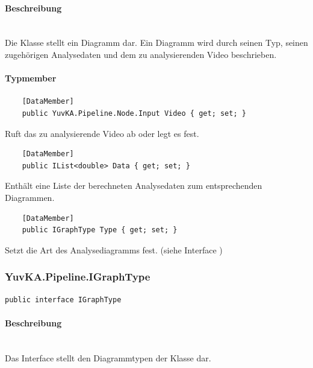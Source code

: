 \paragraph{Beschreibung}~\\
Die Klasse  stellt ein Diagramm dar. Ein Diagramm wird durch seinen Typ, seinen zugehörigen Analysedaten und dem zu analysierenden Video beschrieben.

\paragraph{Typmember}
\begin{itemize}

	\begin{verbatim}
	[DataMember]
	public YuvKA.Pipeline.Node.Input Video { get; set; }
	\end{verbatim}
	Ruft das zu analysierende Video ab oder legt es fest.
	
	\begin{verbatim}
	[DataMember]
	public IList<double> Data { get; set; }
	\end{verbatim}
	Enthält eine Liste der berechneten Analysedaten zum entsprechenden Diagrammen.
	
	\begin{verbatim}
	[DataMember]
	public IGraphType Type { get; set; }
	\end{verbatim}
	Setzt die Art des Analysediagramms fest. (siehe Interface )

\end{itemize}

\subsubsection{YuvKA.Pipeline.IGraphType}
\begin{verbatim}
public interface IGraphType
\end{verbatim}

\paragraph{Beschreibung}~\\
Das Interface  stellt den Diagrammtypen der Klasse  dar.


